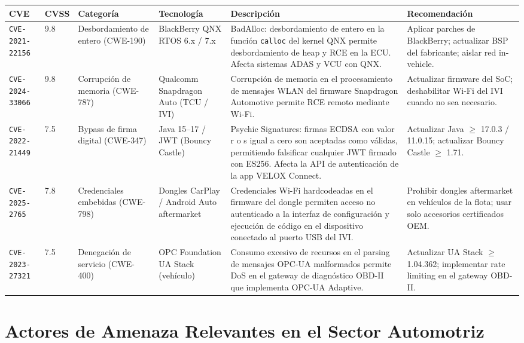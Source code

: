 \documentclass[letterpaper,11pt]{article}
\begin{document}
\begingroup\footnotesize
{}
\begin{tabular}{|p{2.3cm}|p{0.65cm}|p{1.9cm}|p{2.0cm}|p{3.9cm}|p{3.0cm}|}
\hline
\rowcolor{purple!18}
\textbf{CVE} & \textbf{CVSS} & \textbf{Categoría} & \textbf{Tecnología} & \textbf{Descripción} & \textbf{Recomendación} \\
\hline
\texttt{CVE-2021-22156} & 9.8 & Desbordamiento de entero (CWE-190) & BlackBerry QNX RTOS 6.x / 7.x & BadAlloc: desbordamiento de entero en la función \texttt{calloc} del kernel QNX permite desbordamiento de heap y RCE en la ECU. Afecta sistemas ADAS y VCU con QNX. & Aplicar parches de BlackBerry; actualizar BSP del fabricante; aislar red in-vehicle. \\
\hline
\texttt{CVE-2024-33066} & 9.8 & Corrupción de memoria (CWE-787) & Qualcomm Snapdragon Auto (TCU / IVI) & Corrupción de memoria en el procesamiento de mensajes WLAN del firmware Snapdragon Automotive permite RCE remoto mediante Wi-Fi. & Actualizar firmware del SoC; deshabilitar Wi-Fi del IVI cuando no sea necesario. \\
\hline
\texttt{CVE-2022-21449} & 7.5 & Bypass de firma digital (CWE-347) & Java 15--17 / JWT (Bouncy Castle) & Psychic Signatures: firmas ECDSA con valor r o s igual a cero son aceptadas como válidas, permitiendo falsificar cualquier JWT firmado con ES256. Afecta la API de autenticación de la app VELOX Connect. & Actualizar Java $\geq$ 17.0.3 / 11.0.15; actualizar Bouncy Castle $\geq$ 1.71. \\
\hline
\texttt{CVE-2025-2765} & 7.8 & Credenciales embebidas (CWE-798) & Dongles CarPlay / Android Auto aftermarket & Credenciales Wi-Fi hardcodeadas en el firmware del dongle permiten acceso no autenticado a la interfaz de configuración y ejecución de código en el dispositivo conectado al puerto USB del IVI. & Prohibir dongles aftermarket en vehículos de la flota; usar solo accesorios certificados OEM. \\
\hline
\texttt{CVE-2023-27321} & 7.5 & Denegación de servicio (CWE-400) & OPC Foundation UA Stack (vehículo) & Consumo excesivo de recursos en el parsing de mensajes OPC-UA malformados permite DoS en el gateway de diagnóstico OBD-II que implementa OPC-UA Adaptive. & Actualizar UA Stack $\geq$ 1.04.362; implementar rate limiting en el gateway OBD-II. \\
\hline
\end{tabular}
\endgroup

\newpage
\section{Actores de Amenaza Relevantes en el Sector Automotriz}
\end{document}
